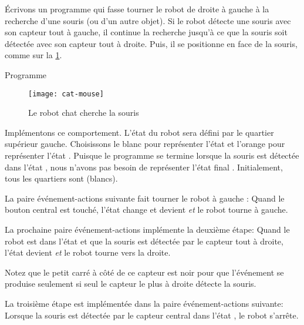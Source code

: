 
Écrivons un programme qui fasse tourner le robot de droite à gauche à la recherche d'une souris (ou d'un autre objet).
Si le robot détecte une souris avec son capteur tout à gauche, il continue la recherche jusqu'à ce que la souris soit détectée avec son capteur tout à droite.
Puis, il se positionne en face de la souris, comme sur la \cref{fig.cat-mouse}.

{\raggedleft \hfill Programme }

\begin{figure}
    \begin{center}
        \texttt{[image: cat-mouse]}
	\caption{Le robot chat cherche la souris}
        \label{fig.cat-mouse}
    \end{center}
\end{figure}

Implémentons ce comportement.
L'état du robot sera défini par le quartier supérieur gauche.
Choisissons le blanc pour représenter l'état  et l'orange pour représenter l'état .
Puisque le programme se termine lorsque la souris est détectée dans l'état ,
nous n'avons pas besoin de représenter l'état final .
Initialement, tous les quartiers sont  (blancs).

La paire événement-actions suivante fait tourner le robot à gauche : 
Quand le bouton central est touché, l'état change et devient
 \emph{et} le robot tourne à gauche.


La prochaine paire événement-actions implémente la deuxième étape: 
Quand le robot est dans l'état  et
que la souris est détectée par le capteur tout à droite,
l'état devient 
\emph{et} le robot tourne vers la droite.

Notez que le petit carré à côté de ce capteur est noir pour que l'événement se produise seulement si seul le capteur le plus à droite détecte la souris.

La troisième étape est implémentée dans la paire événement-actions suivante: 
Lorsque la souris est détectée par le capteur central dans l'état , le robot s'arrête.



